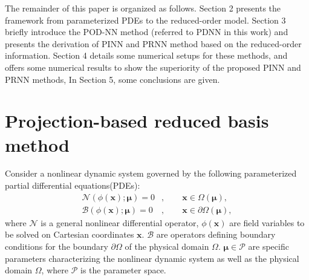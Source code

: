 \documentclass[preprint, 10pt]{elsarticle}
\begin{document}
The remainder of this paper is organized as follows. Section 2 presents the framework from parameterized PDEs to the reduced-order model. Section 3 briefly introduce the POD-NN method (referred to PDNN in this work) and presents the derivation of PINN and PRNN method based on the reduced-order information. Section 4 details some numerical setups for these methods, and offers some numerical results to show the superiority of the proposed PINN and PRNN methods, In Section 5, some conclusions are given.

\section{Projection-based reduced basis method}\label{sec:POD-G}
Consider a nonlinear dynamic system governed by the following parameterized partial differential equations(PDEs):
\begin{equation}
\begin{aligned}
\mathcal{N}\left(\phi\left(\mathbf{x}\right); \pmb{\mu}\right)=0&,  \qquad \mathbf{x} \in \Omega\left(\pmb{\mu}\right),  \\
\mathcal{B}\left(\phi\left(\mathbf{x}\right); \pmb{\mu}\right)=0&,  \qquad \mathbf{x} \in \partial \Omega\left(\pmb{\mu}\right),
\end{aligned}
\label{eq_GoverningEqs}
\end{equation}
where $\mathcal{N}$ is a general nonlinear differential operator, $\phi\left(\mathbf{x}\right)$ are field variables to be solved on Cartesian coordinates $\mathbf{x}$. $\mathcal{B}$ are operators defining boundary conditions for the boundary $\partial \Omega$ of the physical  domain $\Omega$. $\pmb{\mu} \in \mathcal{P}$ are specific parameters characterizing the nonlinear dynamic system as well as the physical domain $\Omega$, where $\mathcal{P}$ is the parameter space.
\end{document}
